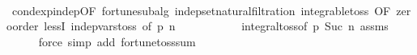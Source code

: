 \begin{isabellebody}
\ \ \ \ \isamarkupfalse%
\ cond{\isacharunderscore}{\kern0pt}exp{\isacharunderscore}{\kern0pt}indep{\isacharbrackleft}{\kern0pt}OF\ fortune{\isachardot}{\kern0pt}subalg\ indep{\isacharunderscore}{\kern0pt}set{\isacharunderscore}{\kern0pt}natural{\isacharunderscore}{\kern0pt}filtration\ integrable{\isacharunderscore}{\kern0pt}toss{\isacharcomma}{\kern0pt}\ OF\ zero{\isacharunderscore}{\kern0pt}order{\isacharparenleft}{\kern0pt}{}{\isacharparenright}{\kern0pt}\ lessI\ indep{\isacharunderscore}{\kern0pt}vars{\isacharunderscore}{\kern0pt}toss{\isacharcomma}{\kern0pt}\ of\ p\ n{\isacharbrackright}{\kern0pt}\ \isanewline
\ \ \ \ \ \ \ \ \ \ integral{\isacharunderscore}{\kern0pt}toss{\isacharbrackleft}{\kern0pt}of\ p\ {\isachardoublequoteopen}Suc\ n{\isachardoublequoteclose}{\isacharbrackright}{\kern0pt}\ assms\isanewline
\ \ \ \ \isamarkupfalse%
\ {\isacharparenleft}{\kern0pt}force\ simp\ add{\isacharcolon}{\kern0pt}\ fortune{\isacharunderscore}{\kern0pt}toss{\isacharunderscore}{\kern0pt}sum{\isacharparenright}{\kern0pt}\isanewline
{}\isamarkupfalse%
%
\endisatagproof
{\isafoldproof}%
%
\isadelimproof
\isanewline
%
\endisadelimproof
%
\isadelimtheory
\isanewline
%
\endisadelimtheory
%
\isatagtheory
{}\isamarkupfalse%
%
\endisatagtheory
{\isafoldtheory}%
%
\isadelimtheory
%
\endisadelimtheory
%
\end{isabellebody}%
\endinput
